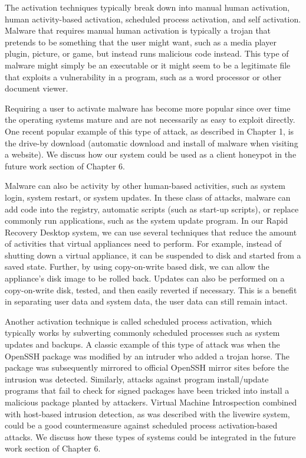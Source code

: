The activation techniques typically break down into manual human activation, human activity-based activation, scheduled process activation, and self activation. Malware that requires manual human activation is typically a trojan that pretends to be something that the user might want, such as a media player plugin, picture, or game, but instead runs malicious code instead. This type of malware might simply be an executable or it might seem to be a legitimate file that exploits a vulnerability in a program, such as a word processor or other document viewer. 

Requiring a user to activate malware has become more popular since over time the operating systems mature and are not necessarily as easy to exploit directly. One recent popular example of this type of attack, as described in Chapter 1, is the drive-by download (automatic download and install of malware when visiting a website).  We discuss how our system could be used as a client honeypot in the future work section of Chapter 6.

Malware can also be activity by other human-based activities, such as system login, system restart, or system updates. In these class of attacks, malware can add code into the registry, automatic scripts (such as start-up scripts), or replace commonly run applications, such as the system update program. In our Rapid Recovery Desktop system, we can use several techniques that reduce the amount of activities that virtual appliances need to perform. For example, instead of shutting down a virtual appliance, it can be suspended to disk and started from a saved state. Further, by using copy-on-write based disk, we can allow the appliance's disk image to be rolled back. Updates can also be performed on a copy-on-write disk, tested, and then easily reverted if necessary. This is a benefit in separating user data and system data, the user data can still remain intact.

Another activation technique is called scheduled process activation, which typically works by subverting commonly scheduled processes such as system updates and backups. A classic example of this type of attack was when the OpenSSH package was modified by an intruder who added a trojan horse\cite{openssh_trojan_2002}. The package was subsequently mirrored to official OpenSSH mirror sites before the intrusion was detected. Similarly, attacks against program install/update programs that fail to check for signed packages have been tricked into install a malicious package planted by attackers\cite{mac_vuln_2010}. Virtual Machine Introspection combined with host-based intrusion detection, as was described with the livewire system\cite{VMI_IDS_2003}, could be a good countermeasure against scheduled process activation-based attacks. We discuss how these types of systems could be integrated in the future work section of Chapter 6.

